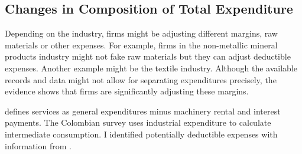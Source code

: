 \documentclass[
  12pt]{article}
\theoremstyle{definition}
\theoremstyle{remark}
\begin{document}
\subsection{Changes in Composition of Total
Expenditure}\label{changes-in-composition-of-total-expenditure}

Depending on the industry, firms might be adjusting different margins,
raw materials or other expenses. For example, firms in the non-metallic
mineral products industry might not fake raw materials but they can
adjust deductible expenses. Another example might be the textile
industry. Although the available records and data might not allow for
separating expenditures precisely, the evidence shows that firms are
significantly adjusting these margins.

\citet{Gandhi2020} defines services as general expenditures minus
machinery rental and interest payments. The Colombian survey uses
industrial expenditure to calculate intermediate consumption. I
identified potentially deductible expenses with information from
\citet{Perry1990}.
\end{document}
